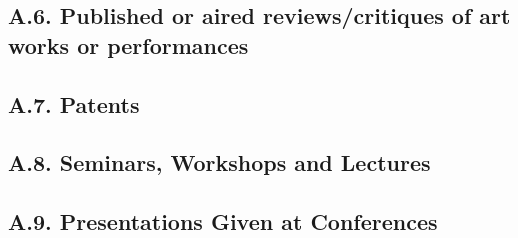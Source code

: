 \documentclass[10pt]{article}
\begin{document}



\subsection*{A.6. Published or aired reviews/critiques of art works or performances}



\subsection*{A.7. Patents}





\subsection*{A.8. Seminars, Workshops and Lectures}




\subsection*{A.9. Presentations Given at Conferences}



\end{document}
